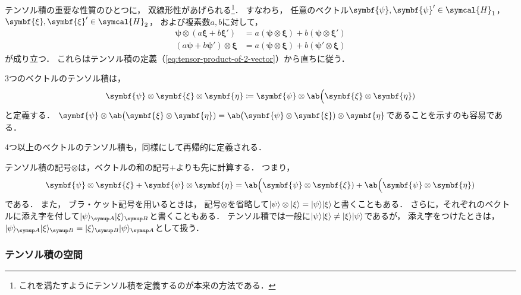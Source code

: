 \documentclass[
]{sotsu}
\newcommand{\bpsi}{\symbf{\psi}}
\newcommand{\bxi}{\symbf{\xi}}
\newcommand{\beeta}{\symbf{\eta}}
\begin{document}
\quad 
テンソル積の重要な性質のひとつに，
双線形性があげられる\footnote{
    これを満たすようにテンソル積を定義するのが本来の方法である．
}．
すなわち，
任意のベクトル$\bpsi, \bpsi' \in \symcal{H}_1$，
$\bxi, \bxi' \in \symcal{H}_2$，
および複素数$a, b$に対して，
\begin{subequations}
    \label{eq:tensor-bilinear}
    \begin{align}
        \bpsi \otimes (a \bxi + b \bxi') &= a (\bpsi \otimes \bxi) + b (\bpsi \otimes \bxi')
        \\
        (a \bpsi + b \bpsi') \otimes \bxi &= a (\bpsi \otimes \bxi) + b (\bpsi' \otimes \bxi)
    \end{align}
\end{subequations}
が成り立つ．
これらはテンソル積の定義（\cref{eq:tensor-product-of-2-vector}）から直ちに従う．



\quad 
3つのベクトルのテンソル積は，
\begin{equation*}
    \bpsi \otimes \bxi \otimes \beeta
        \coloneq \bpsi \otimes \ab\Big(\bxi \otimes \beeta)
\end{equation*}
と定義する．
\(
    \bpsi \otimes \ab\big(\bxi \otimes \beeta)
    = \ab\big(\bpsi \otimes \bxi) \otimes \beeta
\)であることを示すのも容易である．

4つ以上のベクトルのテンソル積も，同様にして再帰的に定義される．



\quad 
テンソル積の記号$\otimes$は，ベクトルの和の記号$+$よりも先に計算する．
つまり，
\begin{equation*}
    \bpsi \otimes \bxi + \bpsi \otimes \beeta
    = \ab\Big(\bpsi \otimes \bxi) + \ab\Big(\bpsi \otimes \beeta)
\end{equation*}
である．
また，
ブラ・ケット記号を用いるときは，
記号$\otimes$を省略して\( 
    \ket{\psi} \otimes \ket{\xi} = \ket{\psi} \ket{\xi} 
\)と書くこともある．
さらに，それぞれのベクトルに添え字を付して\(
    \ket{\psi}<A> \ket{\xi}<B>
\)と書くこともある．
テンソル積では一般に\(
    \ket{\psi} \ket{\xi} \neq \ket{\xi} \ket{\psi}
\)であるが，
添え字をつけたときは，
\(
    \ket{\psi}<A> \ket{\xi}<B> = \ket{\xi}<B> \ket{\psi}<A>
\)として扱う．



\subsubsection{テンソル積の空間}
\end{document}
